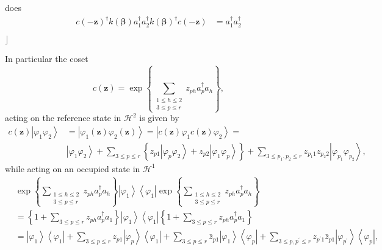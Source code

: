 \documentclass[aps,preprint]{revtex4}%
\begin{document}
does
\begin{align}
c\left(  -\mathbf{z}\right)  ^{\dagger}k\left(  \mathbf{\beta}\right)
a_{1}^{\dagger}a_{2}^{\dagger}k\left(  \mathbf{\beta}\right)  ^{\dagger
}c\left(  -\mathbf{z}\right)   &  =a_{1}^{\dagger}a_{2}^{\dagger}\\
&
\end{align}
$\rfloor$

In particular the coset
\begin{equation}
c\left(  \mathbf{z}\right)  =\exp\left\{  \sum\limits_{\substack{1\leq
h\leq2\\3\leq p\leq r}}z_{ph}a_{p}^{\dagger}a_{h}\right\}  ,\nonumber
\end{equation}
acting on the reference state in $\mathcal{H}^{2}$ is given by%
\begin{align}
c\left(  \mathbf{z}\right)  \left\vert \varphi_{1}\varphi_{2}\right\rangle  &
=\left\vert \varphi_{1}\left(  \mathbf{z}\right)  \varphi_{2}\left(
\mathbf{z}\right)  \right\rangle =\left\vert c\left(  \mathbf{z}\right)
\varphi_{1}c\left(  \mathbf{z}\right)  \varphi_{2}\right\rangle =\nonumber\\
&  \left\vert \varphi_{1}\varphi_{2}\right\rangle +\sum\limits_{3\leq p\leq
r}\left\{  z_{p1}\left\vert \varphi_{p}\varphi_{2}\right\rangle +z_{p2}%
\left\vert \varphi_{1}\varphi_{p}\right\rangle \right\}  +\sum\limits_{3\leq
p_{1},p_{2}\leq r}z_{p_{1}1}z_{p_{2}2}\left\vert \varphi_{p_{1}}\varphi
_{p_{2}}\right\rangle ,
\end{align}
while acting on an occupied state in $\mathcal{H}^{1}$
\begin{align}
&  \exp\left\{  \sum\limits_{\substack{1\leq h\leq2\\3\leq p\leq r}%
}z_{ph}a_{p}^{\dagger}a_{h}\right\}  \left\vert \varphi_{1}\right\rangle
\left\langle \varphi_{1}\right\vert \exp\left\{  \sum\limits_{\substack{1\leq
h\leq2\\3\leq p\leq r}}z_{ph}a_{p}^{\dagger}a_{h}\right\} \nonumber\\
&  =\left\{  1+\sum\limits_{3\leq p\leq r}z_{ph}a_{p}^{\dagger}a_{1}\right\}
\left\vert \varphi_{1}\right\rangle \left\langle \varphi_{1}\right\vert
\left\{  1+\sum\limits_{3\leq p\leq r}z_{ph}a_{p}^{\dagger}a_{1}\right\}
\nonumber\\
&  =\left\vert \varphi_{1}\right\rangle \left\langle \varphi_{1}\right\vert
+\sum\limits_{3\leq p\leq r}z_{p1}\left\vert \varphi_{p}\right\rangle
\left\langle \varphi_{1}\right\vert +\sum\limits_{3\leq p\leq r}\bar{z}%
_{p1}\left\vert \varphi_{1}\right\rangle \left\langle \varphi_{p}\right\vert
+\sum\limits_{3\leq p,p^{\prime}\leq r}z_{p^{\prime}1}\bar{z}_{p1}\left\vert
\varphi_{p^{\prime}}\right\rangle \left\langle \varphi_{p}\right\vert ,
\end{align}
\end{document}
